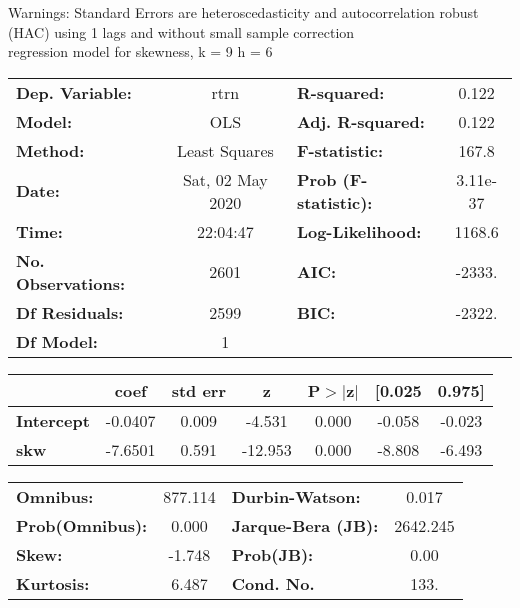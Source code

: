 Warnings: \newline
 [1] Standard Errors are heteroscedasticity and autocorrelation robust (HAC) using 1 lags and without small sample correction\\ 

regression model for skewness, k = 9 h = 6\begin{center}
\begin{tabular}{lclc}
\toprule
\textbf{Dep. Variable:}    &       rtrn       & \textbf{  R-squared:         } &     0.122   \\
\textbf{Model:}            &       OLS        & \textbf{  Adj. R-squared:    } &     0.122   \\
\textbf{Method:}           &  Least Squares   & \textbf{  F-statistic:       } &     167.8   \\
\textbf{Date:}             & Sat, 02 May 2020 & \textbf{  Prob (F-statistic):} &  3.11e-37   \\
\textbf{Time:}             &     22:04:47     & \textbf{  Log-Likelihood:    } &    1168.6   \\
\textbf{No. Observations:} &        2601      & \textbf{  AIC:               } &    -2333.   \\
\textbf{Df Residuals:}     &        2599      & \textbf{  BIC:               } &    -2322.   \\
\textbf{Df Model:}         &           1      & \textbf{                     } &             \\
\bottomrule
\end{tabular}
\begin{tabular}{lcccccc}
                   & \textbf{coef} & \textbf{std err} & \textbf{z} & \textbf{P$> |$z$|$} & \textbf{[0.025} & \textbf{0.975]}  \\
\midrule
\textbf{Intercept} &      -0.0407  &        0.009     &    -4.531  &         0.000        &       -0.058    &       -0.023     \\
\textbf{skw}       &      -7.6501  &        0.591     &   -12.953  &         0.000        &       -8.808    &       -6.493     \\
\bottomrule
\end{tabular}
\begin{tabular}{lclc}
\textbf{Omnibus:}       & 877.114 & \textbf{  Durbin-Watson:     } &    0.017  \\
\textbf{Prob(Omnibus):} &   0.000 & \textbf{  Jarque-Bera (JB):  } & 2642.245  \\
\textbf{Skew:}          &  -1.748 & \textbf{  Prob(JB):          } &     0.00  \\
\textbf{Kurtosis:}      &   6.487 & \textbf{  Cond. No.          } &     133.  \\
\bottomrule
\end{tabular}
\end{center}

